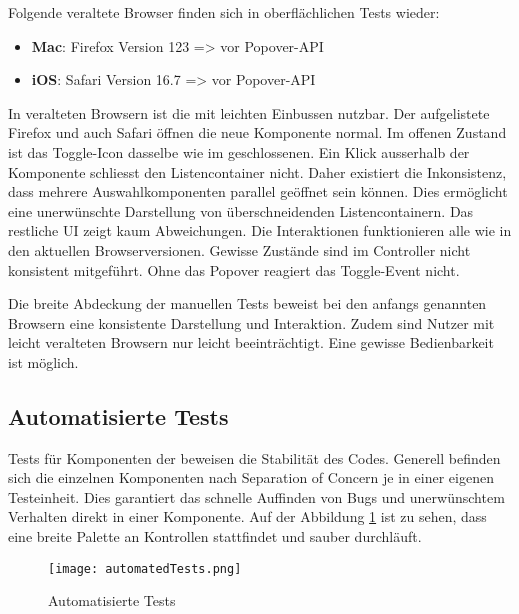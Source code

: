 Folgende veraltete Browser finden sich in oberflächlichen Tests wieder: 

\begin{itemize}
    \item \textbf{Mac}: Firefox Version 123 => vor Popover-API
    \item \textbf{iOS}: Safari Version 16.7 => vor Popover-API
\end{itemize}

In veralteten Browsern ist die  mit leichten Einbussen nutzbar. 
Der aufgelistete Firefox und auch Safari öffnen die neue Komponente normal. 
Im offenen Zustand ist das Toggle-Icon dasselbe wie im geschlossenen. 
Ein Klick ausserhalb der Komponente schliesst den Listencontainer nicht. 
Daher existiert die Inkonsistenz, dass mehrere Auswahlkomponenten parallel geöffnet sein können. 
Dies ermöglicht eine unerwünschte Darstellung von überschneidenden Listencontainern. 
Das restliche UI zeigt kaum Abweichungen. 
Die Interaktionen funktionieren alle wie in den aktuellen Browserversionen. 
Gewisse Zustände sind im Controller nicht konsistent mitgeführt. 
Ohne das Popover reagiert das Toggle-Event nicht.

Die breite Abdeckung der manuellen Tests beweist bei den anfangs genannten Browsern eine konsistente Darstellung und Interaktion. 
Zudem sind Nutzer mit leicht veralteten Browsern nur leicht beeinträchtigt. 
Eine gewisse Bedienbarkeit ist möglich. 


\subsection{Automatisierte Tests}
\label{sec:automatedTests}

Tests für Komponenten der  beweisen die Stabilität des Codes. 
Generell befinden sich die einzelnen Komponenten nach Separation of Concern je in einer eigenen Testeinheit. 
Dies garantiert das schnelle Auffinden von Bugs und unerwünschtem Verhalten direkt in einer Komponente. 
Auf der Abbildung \ref{img:automatedTests} ist zu sehen, dass eine breite Palette an Kontrollen stattfindet und sauber durchläuft. 

\begin{figure}[!htb]
    \centering
    \texttt{[image: automatedTests.png]}
    \caption{\centering Automatisierte Tests}
    \label{img:automatedTests}
\end{figure}

